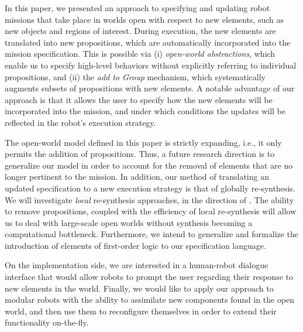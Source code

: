 In this paper, we presented an approach to specifying and updating robot missions that take place in worlds open with respect to new elements, such as new objects and regions of interest. During execution, the new elements are translated into new propositions, which are automatically incorporated into the mission specification. This is possible via (i) \emph{open-world abstractions}, which enable us to specify high-level behaviors without explicitly referring to individual propositions, and (ii) the \emph{add to Group} mechanism, which systematically augments subsets of propositions with new elements. A notable advantage of our approach is that it allows the user to specify how the new elements will be incorporated into the mission, and under which conditions the updates will be reflected in the robot's execution strategy.

The open-world model defined in this paper is strictly expanding, i.e., it only permits the addition of propositions. Thus, a future research direction is to generalize our model in order to account for the removal of elements that are no longer pertinent to the mission. 
In addition, our method of translating an updated specification to a new execution strategy is that of globally re-synthesis. We will investigate \emph{local} re-synthesis approaches, in the direction of \cite{MurrayICRA2012, MurrayICRA2013a}.
The ability to remove propositions, coupled with the efficiency of local re-synthesis will allow us to deal with large-scale open worlds without synthesis becoming a computational bottleneck.
Furthermore, we intend to generalize and formalize the introduction of elements of first-order logic to our specification language.

On the implementation side, we are interested in a human-robot dialogue interface that would allow robots to prompt the user regarding their response to new elements in the world.
Finally, we would like to apply our approach to modular robots \cite{ModularIROS2011} with the ability to assimilate new components found in the open world, and then use them to reconfigure themselves in order to extend their functionality on-the-fly.
